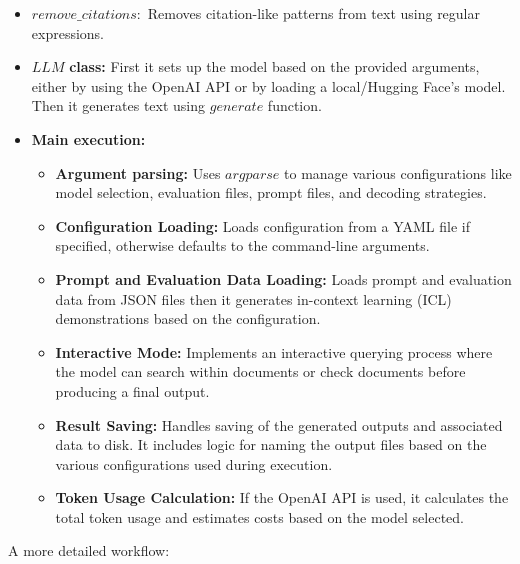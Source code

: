 \begin{itemize}
    \item $remove\_citations:$ Removes citation-like patterns from text using regular expressions.

    \item $LLM$ \textbf{class:} First it sets up the model based on the provided arguments, either by using the OpenAI API or by loading a local/Hugging Face's model. Then it generates text using $generate$ function.

    \item \textbf{Main execution:}
    \begin{itemize}
        \item \textbf{Argument parsing:} Uses $argparse$ to manage various configurations like model selection, evaluation files, prompt files, and decoding strategies.

        \item \textbf{Configuration Loading:} Loads configuration from a YAML file if specified, otherwise defaults to the command-line arguments.

        \item \textbf{Prompt and Evaluation Data Loading:} Loads prompt and evaluation data from JSON files then it generates in-context learning (ICL) demonstrations based on the configuration.

        \item \textbf{Interactive Mode:} Implements an interactive querying process where the model can search within documents or check documents before producing a final output.

        \item \textbf{Result Saving:} Handles saving of the generated outputs and associated data to disk. It includes logic for naming the output files based on the various configurations used during execution.

        \item \textbf{Token Usage Calculation:} If the OpenAI API is used, it calculates the total token usage and estimates costs based on the model selected.
    \end{itemize}
\end{itemize}

A more detailed workflow:

